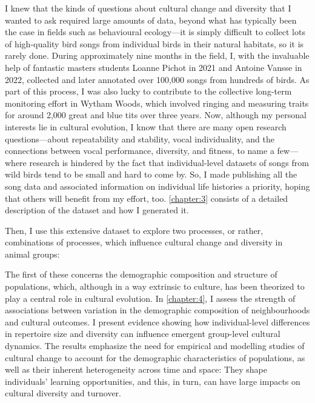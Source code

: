 I knew that the kinds of questions about cultural change and diversity that I wanted to ask required large amounts of data, beyond what has typically been the case in fields such as behavioural ecology---it is simply difficult to collect lots of high-quality bird songs from individual birds in their natural habitats, so it is rarely done. During approximately nine months in the field, I, with the invaluable help of fantastic masters students Loanne Pichot in 2021 and Antoine Vansse in 2022, collected and later annotated over 100,000 songs from hundreds of birds. As part of this process, I was also lucky to contribute to the collective long-term monitoring effort in Wytham Woods, which involved ringing and measuring traits for around 2,000 great and blue tits over three years. Now, although my personal interests lie in cultural evolution, I know that there are many open research questions---about repeatability and stability, vocal individuality, and the connections between vocal performance, diversity, and fitness, to name a few---where research is hindered by the fact that individual-level datasets of songs from wild birds tend to be small and hard to come by. So, I made publishing all the song data and associated information on individual life histories a priority, hoping that others will benefit from my effort, too. \autoref{chapter:3} consists of a detailed description of the dataset and how I generated it.

Then, I use this extensive dataset to explore two processes, or rather, combinations of processes, which influence cultural change and diversity in animal groups:

The first of these concerns the demographic composition and structure of populations, which, although in a way extrinsic to culture, has been theorized to play a central role in cultural evolution. In \autoref{chapter:4}, I assess the strength of associations between variation in the demographic composition of neighbourhoods and cultural outcomes. I present evidence showing how individual-level differences in repertoire size and diversity can influence emergent group-level cultural dynamics. The results emphasize the need for empirical and modelling studies of cultural change to account for the demographic characteristics of populations, as well as their inherent heterogeneity across time and space: They shape individuals' learning opportunities, and this, in turn, can have large impacts on cultural diversity and turnover.

